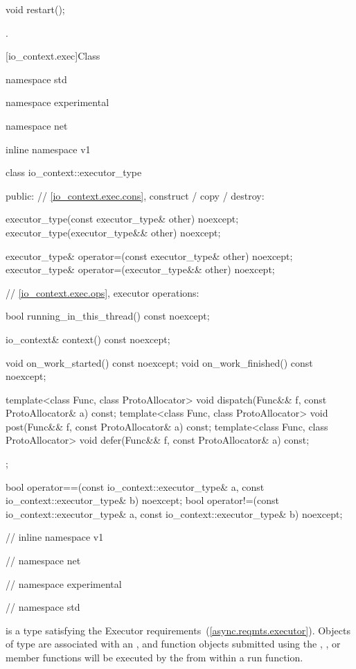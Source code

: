 %
\begin{itemdecl}
void restart();
\end{itemdecl}

\begin{itemdescr}
\pnum
\postconditions {}.
\end{itemdescr}




[io_context.exec]{Class }

%
\begin{codeblock}
namespace std {
namespace experimental {
namespace net {
inline namespace v1 {

  class io_context::executor_type
  {
  public:
    // \ref{io_context.exec.cons}, construct / copy / destroy:

    executor_type(const executor_type& other) noexcept;
    executor_type(executor_type&& other) noexcept;

    executor_type& operator=(const executor_type& other) noexcept;
    executor_type& operator=(executor_type&& other) noexcept;

    // \ref{io_context.exec.ops}, executor operations:

    bool running_in_this_thread() const noexcept;

    io_context& context() const noexcept;

    void on_work_started() const noexcept;
    void on_work_finished() const noexcept;

    template<class Func, class ProtoAllocator>
      void dispatch(Func&& f, const ProtoAllocator& a) const;
    template<class Func, class ProtoAllocator>
      void post(Func&& f, const ProtoAllocator& a) const;
    template<class Func, class ProtoAllocator>
      void defer(Func&& f, const ProtoAllocator& a) const;
  };

  bool operator==(const io_context::executor_type& a,
                  const io_context::executor_type& b) noexcept;
  bool operator!=(const io_context::executor_type& a,
                  const io_context::executor_type& b) noexcept;

} // inline namespace v1
} // namespace net
} // namespace experimental
} // namespace std
\end{codeblock}

\pnum
{} is a type satisfying the Executor requirements~(\ref{async.reqmts.executor}). Objects of type  are associated with an , and function objects submitted using the , , or  member functions will be executed by the  from within a run function.


